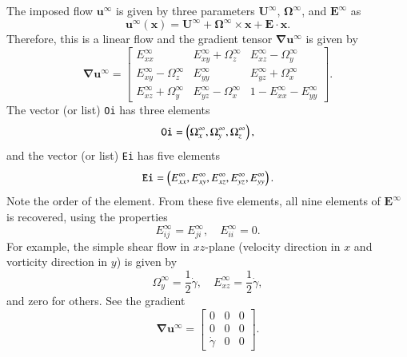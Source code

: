 \documentclass{book}
\begin{document}
The imposed flow $\bm{u}^{\infty}$ is given by three parameters 
$\bm{U}^{\infty}$, $\bm{\Omega}^{\infty}$, and $\bm{E}^{\infty}$ as 
\begin{equation}
  \bm{u}^{\infty}(\bm{x})
  =
  \bm{U}^{\infty}
  +
  \bm{\Omega}^{\infty}\times\bm{x}
  +
  \bm{E}\cdot\bm{x}
  .
\end{equation}
Therefore, this is a linear flow and the gradient tensor 
$\bm{\nabla}\bm{u}^{\infty}$ is given by 
\begin{equation}
  \bm{\nabla}\bm{u}^{\infty}
  =
  \left[
    \begin{array}{ccc}
      E^{\infty}_{xx} & E^{\infty}_{xy}+\Omega^{\infty}_{z} & E^{\infty}_{xz}-\Omega^{\infty}_{y} \\
      E^{\infty}_{xy}-\Omega^{\infty}_{z} & E^{\infty}_{yy} & E^{\infty}_{yz}+\Omega^{\infty}_{x} \\
      E^{\infty}_{xz}+\Omega^{\infty}_{y} & E^{\infty}_{yz}-\Omega^{\infty}_{x} & 1-E^{\infty}_{xx}-E^{\infty}_{yy}
    \end{array}
  \right]
  .
\end{equation}
The vector (or list) {\tt Oi} has three elements
\begin{equation}
  {\tt Oi}
  =
  \left(\Omega^{\infty}_{x}, \Omega^{\infty}_{y}, \Omega^{\infty}_{z}\right)
  ,
\end{equation}
and the vector (or list) {\tt Ei} has five elements
\begin{equation}
  {\tt Ei}
  =
  \left(
    E^{\infty}_{xx},
    E^{\infty}_{xy},
    E^{\infty}_{xz},
    E^{\infty}_{yz},
    E^{\infty}_{yy}
  \right)
  .
\end{equation}
Note the order of the element. 
From these five elements, all nine elements of $\bm{E}^{\infty}$ is recovered, 
using the properties 
\begin{equation}
  E^{\infty}_{ij} = E^{\infty}_{ji},\quad
  E^{\infty}_{ii} = 0.
\end{equation}
For example, the simple shear flow in $xz$-plane 
(velocity direction in $x$ and vorticity direction in $y$) is given by 
\begin{equation}
  \Omega^{\infty}_{y} = \frac{1}{2}\dot{\gamma},\quad
  E^{\infty}_{xz} = \frac{1}{2}\dot{\gamma},
\end{equation}
and zero for others. See the gradient 
\begin{equation}
  \bm{\nabla}\bm{u}^{\infty}
  =
  \left[
    \begin{array}{ccc}
      0 & 0 & 0 \\
      0 & 0 & 0 \\
      \dot{\gamma} & 0 & 0
    \end{array}
  \right]
  .
\end{equation}
\end{document}
